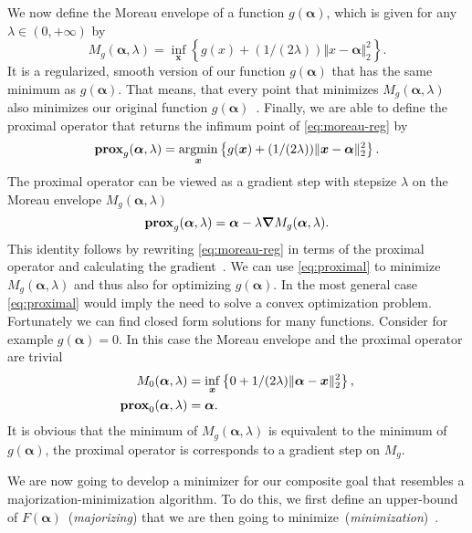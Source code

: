 We now define the Moreau envelope of a function \(g (\bm{\alpha})\), which is given for any \(\lambda \in (0, +\infty)\) by
\begin{equation}
  \label{eq:moreau-reg}
  M_{g}(\bm{\alpha}, \lambda) = \inf_{\bm{x}} \left\{  g(x) + (1/(2\lambda)) \Vert x - \bm{\alpha} \Vert_2^2 \right\}.
\end{equation}
It is a regularized, smooth version of our function \(g(\bm{\alpha})\) that has the
same minimum as \(g(\bm{\alpha})\).
That means, that every point that minimizes \(M_{g}(\bm{\alpha}, \lambda)\) also
minimizes our original function \(g (\bm{\alpha})\)~\cite{proxsurvey}.
Finally, we are able to define the proximal operator that returns the infimum
point of \cref{eq:moreau-reg} by
\begin{equation}
  \label{eq:proximal}
  \prox[\(g\)]{\bm{\alpha}}{\lambda}= \argmin_{\bm{x}} \left\{ g (\bm{x}) + (1/ (2 \lambda)) \Vert \bm{x} - \bm{\alpha} \Vert_2^2 \right\}.
\end{equation}
The proximal operator can be viewed as a gradient step with stepsize \(\lambda\) on the Moreau envelope
\(M_g(\bm{\alpha}, \lambda)\)
\begin{equation*}
  \prox[\(g\)]{\bm{\alpha}}{\lambda} = \bm{\alpha} - \lambda \bm{\nabla} M_{g}(\bm{\alpha}, \lambda).
\end{equation*}
This identity follows by rewriting \cref{eq:moreau-reg} in terms of the proximal operator and calculating the gradient~\cite{proxsurvey}.
We can use \cref{eq:proximal} to minimize \(M_g(\bm{\alpha}, \lambda)\) and
thus also for optimizing \(g(\bm{\alpha})\).
In the most general case \cref{eq:proximal} would imply the need to solve a convex optimization problem.
Fortunately we can find closed form solutions for many functions.
Consider for example \(g(\bm{\alpha}) = 0\).
In this case the Moreau envelope and the proximal operator are trivial
\begin{align*}
 M_{0}(\bm{\alpha}, \lambda) &= \inf_{\bm{x}} \left\{ 0 + 1/(2 \lambda) \Vert \bm{\alpha} - \bm{x} \Vert_2^2 \right\}, \\
 \prox[\(0\)]{\bm{\alpha}}{\lambda} &= \bm{\alpha}.
\end{align*}
It is obvious that the minimum of \(M_g(\bm{\alpha}, \lambda)\) is equivalent to the minimum of \(g(\bm{\alpha})\), the proximal operator is corresponds to a gradient step on \(M_g\).

We are now going to develop a minimizer for our composite goal that resembles a majorization-minimization algorithm.
To do this, we first define an upper-bound of \(F(\bm{\alpha})\)~(\emph{majorizing}) that we are then going to minimize~(\emph{minimization})~\autocite{proxsurvey}.

